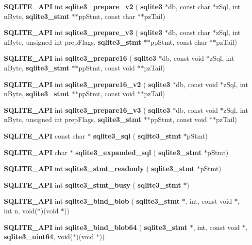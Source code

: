 \begin{DoxyCompactItemize}
\item 
\textbf{ S\+Q\+L\+I\+T\+E\+\_\+\+A\+PI} int \textbf{ sqlite3\+\_\+prepare\+\_\+v2} (\textbf{ sqlite3} $\ast$db, const char $\ast$z\+Sql, int n\+Byte, \textbf{ sqlite3\+\_\+stmt} $\ast$$\ast$pp\+Stmt, const char $\ast$$\ast$pz\+Tail)
\item 
\textbf{ S\+Q\+L\+I\+T\+E\+\_\+\+A\+PI} int \textbf{ sqlite3\+\_\+prepare\+\_\+v3} (\textbf{ sqlite3} $\ast$db, const char $\ast$z\+Sql, int n\+Byte, unsigned int prep\+Flags, \textbf{ sqlite3\+\_\+stmt} $\ast$$\ast$pp\+Stmt, const char $\ast$$\ast$pz\+Tail)
\item 
\textbf{ S\+Q\+L\+I\+T\+E\+\_\+\+A\+PI} int \textbf{ sqlite3\+\_\+prepare16} (\textbf{ sqlite3} $\ast$db, const void $\ast$z\+Sql, int n\+Byte, \textbf{ sqlite3\+\_\+stmt} $\ast$$\ast$pp\+Stmt, const void $\ast$$\ast$pz\+Tail)
\item 
\textbf{ S\+Q\+L\+I\+T\+E\+\_\+\+A\+PI} int \textbf{ sqlite3\+\_\+prepare16\+\_\+v2} (\textbf{ sqlite3} $\ast$db, const void $\ast$z\+Sql, int n\+Byte, \textbf{ sqlite3\+\_\+stmt} $\ast$$\ast$pp\+Stmt, const void $\ast$$\ast$pz\+Tail)
\item 
\textbf{ S\+Q\+L\+I\+T\+E\+\_\+\+A\+PI} int \textbf{ sqlite3\+\_\+prepare16\+\_\+v3} (\textbf{ sqlite3} $\ast$db, const void $\ast$z\+Sql, int n\+Byte, unsigned int prep\+Flags, \textbf{ sqlite3\+\_\+stmt} $\ast$$\ast$pp\+Stmt, const void $\ast$$\ast$pz\+Tail)
\item 
\textbf{ S\+Q\+L\+I\+T\+E\+\_\+\+A\+PI} const char $\ast$ \textbf{ sqlite3\+\_\+sql} (\textbf{ sqlite3\+\_\+stmt} $\ast$p\+Stmt)
\item 
\textbf{ S\+Q\+L\+I\+T\+E\+\_\+\+A\+PI} char $\ast$ \textbf{ sqlite3\+\_\+expanded\+\_\+sql} (\textbf{ sqlite3\+\_\+stmt} $\ast$p\+Stmt)
\item 
\textbf{ S\+Q\+L\+I\+T\+E\+\_\+\+A\+PI} int \textbf{ sqlite3\+\_\+stmt\+\_\+readonly} (\textbf{ sqlite3\+\_\+stmt} $\ast$p\+Stmt)
\item 
\textbf{ S\+Q\+L\+I\+T\+E\+\_\+\+A\+PI} int \textbf{ sqlite3\+\_\+stmt\+\_\+busy} (\textbf{ sqlite3\+\_\+stmt} $\ast$)
\item 
\textbf{ S\+Q\+L\+I\+T\+E\+\_\+\+A\+PI} int \textbf{ sqlite3\+\_\+bind\+\_\+blob} (\textbf{ sqlite3\+\_\+stmt} $\ast$, int, const void $\ast$, int n, void($\ast$)(void $\ast$))
\item 
\textbf{ S\+Q\+L\+I\+T\+E\+\_\+\+A\+PI} int \textbf{ sqlite3\+\_\+bind\+\_\+blob64} (\textbf{ sqlite3\+\_\+stmt} $\ast$, int, const void $\ast$, \textbf{ sqlite3\+\_\+uint64}, void($\ast$)(void $\ast$))

\end{DoxyCompactItemize}
